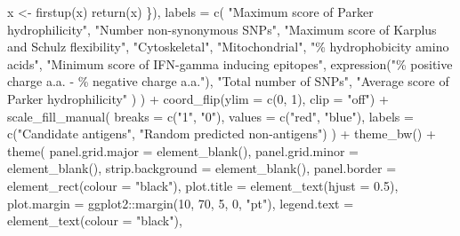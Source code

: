 \documentclass[
  11pt,
  oneside]{book}
\newenvironment{Shaded}{\begin{snugshade}}{\end{snugshade}}
\newcommand{\AttributeTok}[1]{\textcolor[rgb]{0.77,0.63,0.00}{#1}}
\newcommand{\DecValTok}[1]{\textcolor[rgb]{0.00,0.00,0.81}{#1}}
\newcommand{\FloatTok}[1]{\textcolor[rgb]{0.00,0.00,0.81}{#1}}
\newcommand{\FunctionTok}[1]{\textcolor[rgb]{0.00,0.00,0.00}{#1}}
\newcommand{\NormalTok}[1]{#1}
\newcommand{\OtherTok}[1]{\textcolor[rgb]{0.56,0.35,0.01}{#1}}
\newcommand{\SpecialCharTok}[1]{\textcolor[rgb]{0.00,0.00,0.00}{#1}}
\newcommand{\StringTok}[1]{\textcolor[rgb]{0.31,0.60,0.02}{#1}}
\begin{document}
\begin{Shaded}
\begin{Highlighting}[]
\NormalTok{      x }\OtherTok{\textless{}{-}} \FunctionTok{firstup}\NormalTok{(x)}
      \FunctionTok{return}\NormalTok{(x)}
\NormalTok{    \}),}
    \AttributeTok{labels =} \FunctionTok{c}\NormalTok{(}
      \StringTok{"Maximum score of Parker hydrophilicity"}\NormalTok{,}
      \StringTok{"Number non{-}synonymous SNPs"}\NormalTok{,}
      \StringTok{"Maximum score of Karplus and Schulz flexibility"}\NormalTok{,}
      \StringTok{"Cytoskeletal"}\NormalTok{,}
      \StringTok{"Mitochondrial"}\NormalTok{,}
      \StringTok{"\% hydrophobicity amino acids"}\NormalTok{,}
      \StringTok{"Minimum score of IFN{-}gamma inducing epitopes"}\NormalTok{,}
      \FunctionTok{expression}\NormalTok{(}\StringTok{"\% positive charge a.a. {-} \% negative charge a.a."}\NormalTok{),}
      \StringTok{"Total number of SNPs"}\NormalTok{,}
      \StringTok{"Average score of Parker hydrophilicity"}
\NormalTok{    )}
\NormalTok{  ) }\SpecialCharTok{+}
  \FunctionTok{coord\_flip}\NormalTok{(}\AttributeTok{ylim =} \FunctionTok{c}\NormalTok{(}\DecValTok{0}\NormalTok{, }\DecValTok{1}\NormalTok{), }\AttributeTok{clip =} \StringTok{"off"}\NormalTok{) }\SpecialCharTok{+}
  \FunctionTok{scale\_fill\_manual}\NormalTok{(}
    \AttributeTok{breaks =} \FunctionTok{c}\NormalTok{(}\StringTok{"1"}\NormalTok{, }\StringTok{"0"}\NormalTok{), }\AttributeTok{values =} \FunctionTok{c}\NormalTok{(}\StringTok{"red"}\NormalTok{, }\StringTok{"blue"}\NormalTok{),}
    \AttributeTok{labels =} \FunctionTok{c}\NormalTok{(}\StringTok{"Candidate antigens"}\NormalTok{, }\StringTok{"Random predicted non{-}antigens"}\NormalTok{)}
\NormalTok{  ) }\SpecialCharTok{+}
  \FunctionTok{theme\_bw}\NormalTok{() }\SpecialCharTok{+}
  \FunctionTok{theme}\NormalTok{(}
    \AttributeTok{panel.grid.major =} \FunctionTok{element\_blank}\NormalTok{(),}
    \AttributeTok{panel.grid.minor =} \FunctionTok{element\_blank}\NormalTok{(),}
    \AttributeTok{strip.background =} \FunctionTok{element\_blank}\NormalTok{(),}
    \AttributeTok{panel.border =} \FunctionTok{element\_rect}\NormalTok{(}\AttributeTok{colour =} \StringTok{"black"}\NormalTok{),}
    \AttributeTok{plot.title =} \FunctionTok{element\_text}\NormalTok{(}\AttributeTok{hjust =} \FloatTok{0.5}\NormalTok{),}
    \AttributeTok{plot.margin =}\NormalTok{ ggplot2}\SpecialCharTok{::}\FunctionTok{margin}\NormalTok{(}\DecValTok{10}\NormalTok{, }\DecValTok{70}\NormalTok{, }\DecValTok{5}\NormalTok{, }\DecValTok{0}\NormalTok{, }\StringTok{"pt"}\NormalTok{),}
    \AttributeTok{legend.text =} \FunctionTok{element\_text}\NormalTok{(}\AttributeTok{colour =} \StringTok{"black"}\NormalTok{),}

\end{Highlighting}
\end{Shaded}
\end{document}

